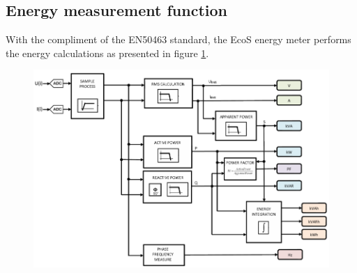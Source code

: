 	\newpage
	
\subsection{Energy measurement function}
\label{subs:324}

With the compliment of the EN50463 standard, the EcoS energy meter performs the energy calculations as presented in figure \ref{fig:energy_calculation}.

\begin{figure}[h!]
	\centering
	\begin{minipage}{.8\textwidth}
		\centering
		\vspace{-0.5em}
		\includegraphics[width=\textwidth,keepaspectratio]{figures/32.EnergyS/energy_calculation}
		\label{fig:energy_calculation}
				\vspace{-1em}
	\end{minipage}
\end{figure}

